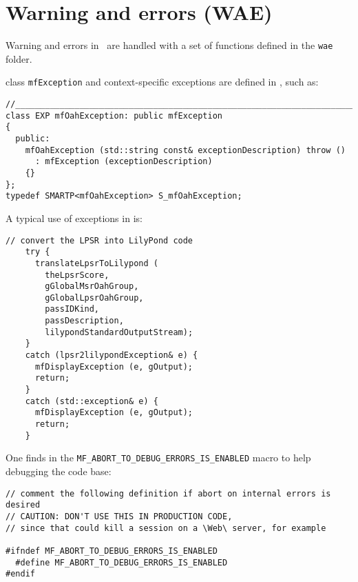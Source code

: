 
\chapter{Warning and errors (WAE)}


Warning and errors in \mf\ are handled with a set of functions defined in the {\tt wae} folder.

class   {\tt mfException} and context-specific exceptions are defined in , such as:
\begin{lstlisting}[language=CPlusPlus]
//______________________________________________________________________________
class EXP mfOahException: public mfException
{
  public:
    mfOahException (std::string const& exceptionDescription) throw ()
      : mfException (exceptionDescription)
    {}
};
typedef SMARTP<mfOahException> S_mfOahException;
\end{lstlisting}

A typical use of exceptions in  is:
\begin{lstlisting}[language=CPlusPlus]
    // convert the LPSR into LilyPond code
    try {
      translateLpsrToLilypond (
        theLpsrScore,
        gGlobalMsrOahGroup,
        gGlobalLpsrOahGroup,
        passIDKind,
        passDescription,
        lilypondStandardOutputStream);
    }
    catch (lpsr2lilypondException& e) {
      mfDisplayException (e, gOutput);
      return;
    }
    catch (std::exception& e) {
      mfDisplayException (e, gOutput);
      return;
    }
\end{lstlisting}


One finds in  the {\tt MF_ABORT_TO_DEBUG_ERRORS_IS_ENABLED} macro to help debugging the code base:
\begin{lstlisting}[language=CPlusPlus]
// comment the following definition if abort on internal errors is desired
// CAUTION: DON'T USE THIS IN PRODUCTION CODE,
// since that could kill a session on a \Web\ server, for example

#ifndef MF_ABORT_TO_DEBUG_ERRORS_IS_ENABLED
  #define MF_ABORT_TO_DEBUG_ERRORS_IS_ENABLED
#endif
\end{lstlisting}

